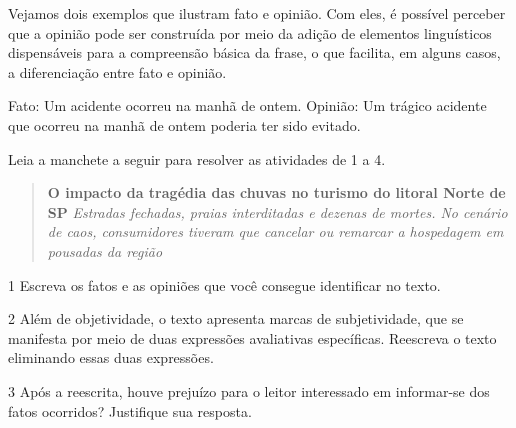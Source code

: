 Vejamos dois exemplos que ilustram fato e opinião. Com eles, é possível
perceber que a opinião pode ser construída por meio da adição de
elementos linguísticos dispensáveis para a compreensão básica da frase,
o que facilita, em alguns casos, a diferenciação entre fato e opinião.

Fato: Um acidente ocorreu na manhã de ontem. Opinião: Um trágico
acidente que ocorreu na manhã de ontem poderia ter sido evitado.


Leia a manchete a seguir para resolver as atividades de 1 a 4.

\begin{quote}
\textbf{O impacto da tragédia das chuvas no turismo do litoral Norte de
SP} \emph{Estradas fechadas, praias interditadas e dezenas de mortes. No
cenário de caos, consumidores tiveram que cancelar ou remarcar a
hospedagem em pousadas da região}
\end{quote}


\num{1} Escreva os fatos e as opiniões que você consegue identificar no
texto.


\num{2} Além de objetividade, o texto apresenta marcas de subjetividade,
que se manifesta por meio de duas expressões avaliativas específicas.
Reescreva o texto eliminando essas duas expressões.


\num{3} Após a reescrita, houve prejuízo para o leitor interessado em
informar-se dos fatos ocorridos? Justifique sua resposta.


